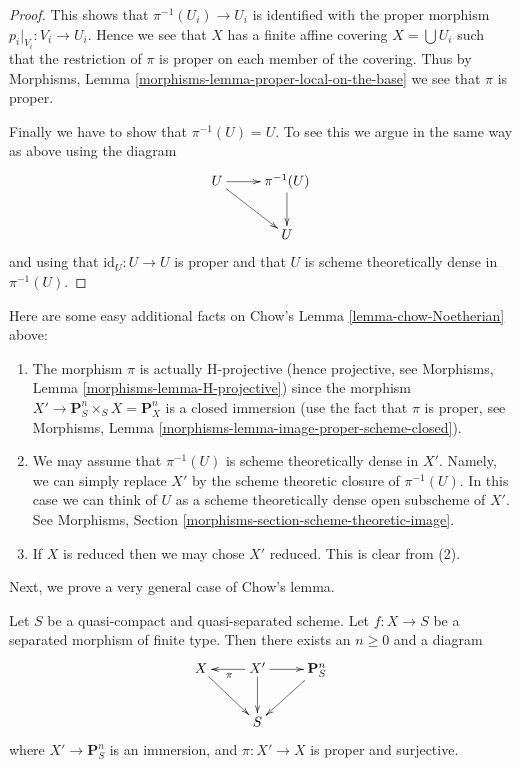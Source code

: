\begin{proof}
\medskip\noindent
This shows that $\pi^{-1}(U_i) \to U_i$ is identified with the proper
morphism $p_i|_{V_i} : V_i \to U_i$. Hence we see that $X$ has a
finite affine covering $X = \bigcup U_i$ such that the restriction
of $\pi$ is proper on each member of the covering.
Thus by Morphisms, Lemma \ref{morphisms-lemma-proper-local-on-the-base}
we see that $\pi$ is proper.

\medskip\noindent
Finally we have to show that $\pi^{-1}(U) = U$. To see this we argue in the
same way as above using the diagram
$$
\xymatrix{
U \ar[r] \ar[rd] & \pi^{-1}(U) \ar[d] \\
& U
}
$$
and using that $\text{id}_U : U \to U$ is proper and that
$U$ is scheme theoretically dense in $\pi^{-1}(U)$.
\end{proof}

\begin{remark}
\label{remark-chow-Noetherian}
Here are some easy additional facts on
Chow's Lemma \ref{lemma-chow-Noetherian} above:
\begin{enumerate}
\item The morphism $\pi$ is actually H-projective (hence projective, see
Morphisms, Lemma \ref{morphisms-lemma-H-projective})
since the morphism $X' \to \mathbf{P}^n_S \times_S X = \mathbf{P}^n_X$
is a closed immersion (use the fact that $\pi$ is proper, see
Morphisms, Lemma \ref{morphisms-lemma-image-proper-scheme-closed}).
\item We may assume that $\pi^{-1}(U)$ is scheme theoretically dense
in $X'$. Namely, we can simply replace $X'$ by the scheme theoretic
closure of $\pi^{-1}(U)$. In this case we can think of $U$ as a
scheme theoretically dense open subscheme of $X'$.
See Morphisms, Section \ref{morphisms-section-scheme-theoretic-image}.
\item If $X$ is reduced then we may chose $X'$ reduced. This is clear
from (2).
\end{enumerate}
\end{remark}

\noindent
Next, we prove a very general case of Chow's lemma.

\begin{lemma}
\label{lemma-chow-finite-type}
Let $S$ be a quasi-compact and quasi-separated scheme.
Let $f : X \to S$ be a separated morphism of finite type.
Then there exists an $n \geq 0$ and a diagram
$$
\xymatrix{
X \ar[rd] & X' \ar[d] \ar[l]^\pi \ar[r] & \mathbf{P}^n_S \ar[dl] \\
& S &
}
$$
where $X' \to \mathbf{P}^n_S$ is an immersion, and
$\pi : X' \to X$ is proper and surjective.
\end{lemma}

